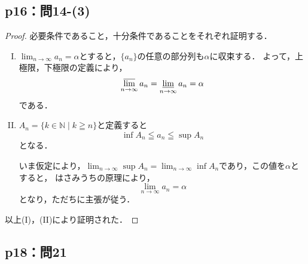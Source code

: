 \documentclass[uplatex,dvipdfmx,a4paper,10pt,fleqn]{jsarticle}
\begin{document}
\subsection*{p16：問14-(3)}

\begin{tleftbar}
    \begin{proof}
    必要条件であること，十分条件であることをそれぞれ証明する．
    \begin{enumerate}[(I)]
        \item $\lim_{n \to \infty} a_n = \alpha$とすると，$\{ a_n \}$の任意の部分列も$\alpha$に収束する．
        よって，上極限，下極限の定義により，
        \[
            \varlimsup_{n \to \infty} a_n = \varliminf_{n \to \infty} a_n = \alpha
        \]
        である．
        \item $ A_n =\{ k \in \mathbb{N} \mid k \geqq n \}$と定義すると
        \[
            \inf A_n \leqq a_n \leqq \sup A_n
        \]
        となる．

        いま仮定により，$\lim_{n \to \infty} \sup A_n = \lim_{n \to \infty} \inf A_n$であり，この値を$\alpha$とすると，
        はさみうちの原理により，
        \[
            \lim_{n \to \infty} a_n = \alpha
        \]
        となり，ただちに主張が従う．
    \end{enumerate}
    以上(I)，(II)により証明された．
\end{proof}
\end{tleftbar}


\subsection*{p18：問21}
\end{document}
